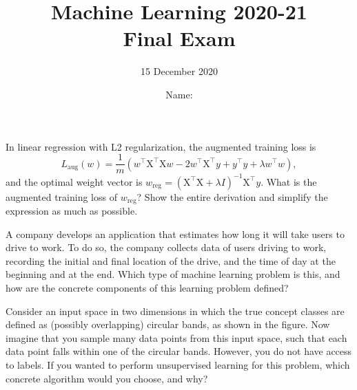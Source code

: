 \documentclass[11pt]{article}
\title{
\vspace{-1.2cm}
Machine Learning 2020-21\\ Final Exam}
\author{15 December 2020}
\date{Name: \dotfill}%
\newcounter{marks}
\begin{document}
\maketitle


\begin{list}{{\bf Question :}}
	{
	}

\item
{}
\addtocounter{marks}{2}
In linear regression with L2 regularization, the augmented training loss is \[L_{\mathrm{aug}}(w)=\frac 1 m (w^\top\mathrm{X}^\top\mathrm{X}w - 2w^\top\mathrm{X}^\top y + y^\top y + \lambda w^\top w),\] and the optimal weight vector is $w_{\mathrm{reg}}=(\mathrm{X}^\top\mathrm{X} + \lambda I)^{-1}\mathrm{X}^\top y$. What is the augmented training loss of $w_{\mathrm{reg}}$? Show the entire derivation and simplify the expression as much as possible.

\framebox[16cm][l]{ 
\parbox{15.9cm}{
\vspace*{7cm}
}}

\item
{}
\addtocounter{marks}{2}
A company develops an application that estimates how long it will take users to drive to work. To do so, the company collects data of users driving to work, recording the initial and final location of the drive, and the time of day at the beginning and at the end. Which type of machine learning problem is this, and how are the concrete components of this learning problem defined?

\framebox[16cm][l]{ 
\parbox{15.9cm}{
\vspace*{6.5cm}
}}

\pagebreak

\begin{center}
\end{center}

\item
{}
\addtocounter{marks}{1}
Consider an input space in two dimensions in which the true concept classes are defined as (possibly overlapping) circular bands, as shown in the figure. Now imagine that you sample many data points from this input space, such that each data point falls within one of the circular bands. However, you do not have access to labels. If you wanted to perform unsupervised learning for this problem, which concrete algorithm would you choose, and why?


\end{list}
\end{document}
